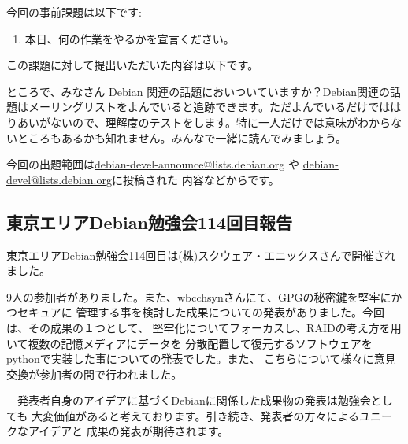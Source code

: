 \documentclass[mingoth,a4paper]{jsarticle}
\begin{document}

今回の事前課題は以下です:
\begin{enumerate}
 \item 本日、何の作業をやるかを宣言ください。
\end{enumerate}
この課題に対して提出いただいた内容は以下です。
\begin{multicols}{2}
{\small
 
}
\end{multicols}


ところで、みなさん Debian 関連の話題においついていますか？Debian関連の話
題はメーリングリストをよんでいると追跡できます。ただよんでいるだけではは
りあいがないので、理解度のテストをします。特に一人だけでは意味がわからな
いところもあるかも知れません。みんなで一緒に読んでみましょう。

今回の出題範囲は\url{debian-devel-announce@lists.debian.org} や \url{debian-devel@lists.debian.org}に投稿された
内容などからです。

\begin{multicols}{2}

\end{multicols}


\subsection{東京エリアDebian勉強会114回目報告}

 東京エリアDebian勉強会114回目は(株)スクウェア・エニックスさんで開催されました。
 
 9人の参加者がありました。また、wbcchsynさんにて、GPGの秘密鍵を堅牢にかつセキュアに
管理する事を検討した成果についての発表がありました。今回は、その成果の１つとして、
堅牢化についてフォーカスし、RAIDの考え方を用いて複数の記憶メディアにデータを
分散配置して復元するソフトウェアをpythonで実装した事についての発表でした。また、
こちらについて様々に意見交換が参加者の間で行われました。

　発表者自身のアイデアに基づくDebianに関係した成果物の発表は勉強会としても
大変価値があると考えております。引き続き、発表者の方々によるユニークなアイデアと
成果の発表が期待されます。


\end{document}
